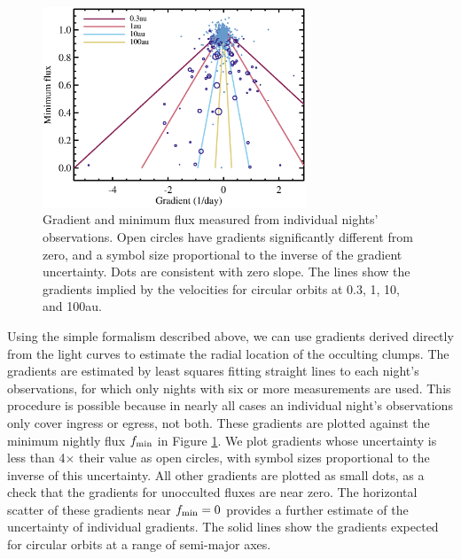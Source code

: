 \documentclass[]{rsos}
\begin{document}
\begin{figure}
  \begin{center}
    \hspace{-0.5cm} \includegraphics[width=0.7\textwidth]{figs/gradients.eps}
    \caption{Gradient and minimum flux measured from individual nights'
      observations. Open circles have gradients significantly different from zero, and a
      symbol size proportional to the inverse of the gradient uncertainty. Dots are
      consistent with zero slope. The lines show the gradients implied by the velocities
      for circular orbits at 0.3, 1, 10, and 100au.}\label{fig:grad}
  \end{center}
\end{figure}

Using the simple formalism described above, we can use gradients derived directly from
the light curves to estimate the radial location of the occulting clumps. The gradients
are estimated by least squares fitting straight lines to each night's observations, for
which only nights with six or more measurements are used. This procedure is possible
because in nearly all cases an individual night's observations only cover ingress or
egress, not both. These gradients are plotted against the minimum nightly flux
$f_{\rm min}$ in Figure \ref{fig:grad}. We plot gradients whose uncertainty is less than
4$\times$ their value as open circles, with symbol sizes proportional to the inverse of
this uncertainty. All other gradients are plotted as small dots, as a check that the
gradients for unocculted fluxes are near zero. The horizontal scatter of these gradients
near $f_{\rm min}=0$ provides a further estimate of the uncertainty of individual
gradients. The solid lines show the gradients expected for circular orbits at a range of
semi-major axes.
\end{document}
